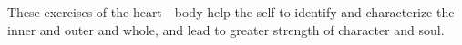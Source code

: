 

These exercises of the heart - body help the self to identify and
characterize the inner and outer and whole, and lead to greater
strength of character and soul.

\bye
